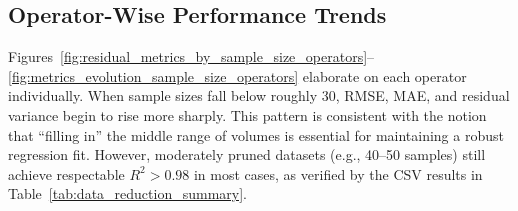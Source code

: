 \subsection{Operator-Wise Performance Trends}
\label{subsec:operator-wise-sample-size-analysis}

Figures~\ref{fig:residual_metrics_by_sample_size_operators}--\ref{fig:metrics_evolution_sample_size_operators} elaborate on each operator individually.
When sample sizes fall below roughly 30, \ac{RMSE}, \ac{MAE}, and residual variance begin to rise more sharply.
This pattern is consistent with the notion that “filling in” the middle range of volumes is essential for maintaining a robust regression fit.
However, moderately pruned datasets (e.g., 40–50 samples) still achieve respectable $R^2 > 0.98$ in most cases, as verified by the CSV results in Table~\ref{tab:data_reduction_summary}.

